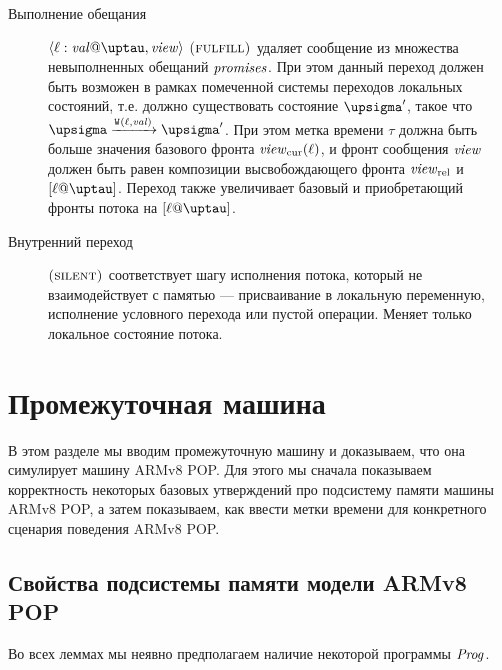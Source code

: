 \begin{description}
  \item[Выполнение обещания] $\writeEvt{\loc}{\stval}{\tau}{\R}$ $\textsc{(fulfill)}$ удаляет сообщение из множества
    невыполненных обещаний $\mathit{promises}$. При этом данный переход должен быть возможен в
    рамках помеченной системы переходов локальных состояний, т.е. должно существовать
    состояние $\pstate'$, такое что $\pstate \xrightarrow{\wlab{}{\loc}{\stval}} \pstate'$.
    При этом метка времени $\tau$ должна быть больше значения базового фронта $\mathit{view}_{\mathrm{cur}}(\ell)$,
    и фронт сообщения $\mathit{view}$ должен быть равен композиции высвобождающего фронта $\mathit{view}_{\mathrm{rel}}$
    и $[\loc@\tau]$. Переход также увеличивает базовый и приобретающий фронты потока на $[\loc@\tau]$.

  \item[Внутренний переход] $\textsc{(silent)}$ соответствует шагу исполнения потока, который не взаимодействует
    с памятью --- присваивание в локальную переменную, исполнение условного перехода или пустой операции.
    Меняет только локальное состояние потока.
\end{description}

\section{Промежуточная машина \ARMt}
В этом разделе мы вводим промежуточную машину \ARMt и доказываем, что она симулирует
машину ARMv8 POP.
Для этого мы сначала показываем корректность некоторых базовых утверждений
про подсистему памяти машины ARMv8 POP,
а затем показываем, как ввести метки времени для конкретного сценария поведения ARMv8 POP.

\subsection{Свойства подсистемы памяти модели ARMv8 POP}
Во всех леммах мы неявно предполагаем наличие некоторой программы $\mathit{Prog}$.

